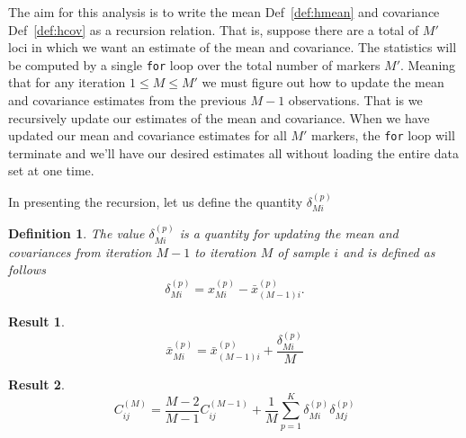\documentclass{article}
\newtheorem{definition}{Definition}
\newtheorem{result}{Result}
\newcommand{\defref}[1]{Def~\ref{#1}}
\newcommand{\hapP}[1]{x_{#1}^{(p)}}
\newcommand{\bhapP}[1]{\bar{x}_{#1}^{(p)}}
\newcommand{\deltaP}[1]{\delta_{#1}^{(p)}}
\newcommand{\hcovM}[1]{C^{(#1)}}
\begin{document}
The aim for this analysis is to write the mean \defref{def:hmean}
and covariance \defref{def:hcov} as a recursion relation.  That is, 
suppose there are a total of $M'$ loci in which we want an estimate
of the mean and covariance.  The statistics will be computed by a single
\texttt{for} loop over the total number of markers $M'$.  Meaning that 
for any iteration $1\leq M\leq M'$ we must figure out how to update the mean
and covariance estimates from the previous $M-1$ observations.  That is
we recursively update our estimates of the mean and covariance.  When we have
updated our mean and covariance estimates for all $M'$ markers, the \texttt{for}
loop will terminate and we'll have our desired estimates all without 
loading the entire data set at one time.

In presenting the recursion, let us define the quantity $\deltaP{Mi}$
%
\begin{definition}\label{def:delta}
    The value $\deltaP{Mi}$ is a quantity for updating the mean and covariances
    from iteration $M-1$ to iteration $M$ of sample $i$ and is defined as follows
    \begin{equation}\nonumber
        \deltaP{Mi} = \hapP{Mi} - \bhapP{(M-1)i}.
    \end{equation}
\end{definition}

\begin{result}\label{res:mean}
    \begin{equation}\nonumber
        \bhapP{Mi} = \bhapP{(M-1)i} + \frac{\deltaP{Mi}}{M}
    \end{equation}
\end{result}

\begin{result}\label{res:cov}
    \begin{equation}\nonumber
        \hcovM{M}_{ij} = \frac{M-2}{M-1}\hcovM{M-1}_{ij} 
            + \frac{1}{M}\sum_{p=1}^K\deltaP{Mi}\deltaP{Mj}
    \end{equation}
\end{result}



\end{document}

